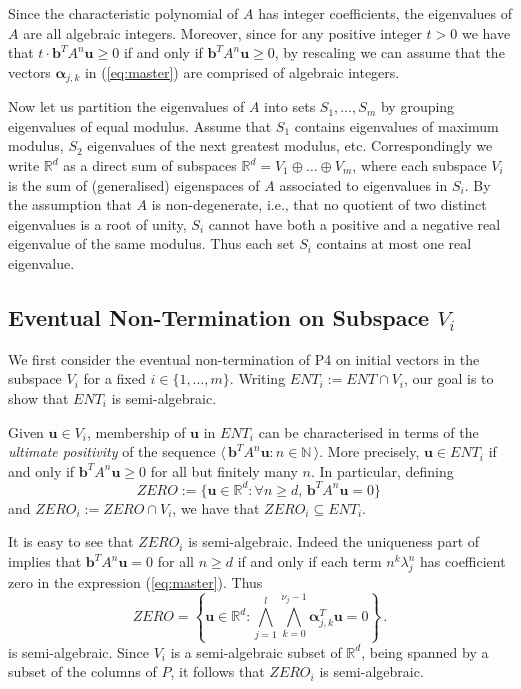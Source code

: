 Since the characteristic polynomial of $A$ has integer coefficients,
the eigenvalues of $A$ are all algebraic integers.  Moreover, since
for any positive integer $t>0$ we have that $t\cdot
\boldsymbol{b}^TA^n\boldsymbol{u} \geq 0$ if and only if
$\boldsymbol{b}^TA^n\boldsymbol{u}\geq 0$, by rescaling we can assume that
the vectors $\boldsymbol{\alpha}_{j,k}$ in (\ref{eq:master}) are
comprised of algebraic integers.

Now let us partition the eigenvalues of $A$ into sets $S_1,\ldots,S_m$
by grouping eigenvalues of equal modulus.  Assume that $S_1$ contains
eigenvalues of maximum modulus, $S_2$ eigenvalues of the next greatest
modulus, etc.  Correspondingly we write $\mathbb{R}^d$ as a
direct sum of subspaces $\mathbb{R}^d = V_1 \oplus \ldots \oplus V_m$,
where each subspace $V_i$ is the sum of (generalised) eigenspaces of
$A$ associated to eigenvalues in $S_i$.  By the assumption that $A$ is
non-degenerate, i.e., that no quotient of two distinct eigenvalues is
a root of unity, $S_i$ cannot have both a positive and a negative real
eigenvalue of the same modulus.  Thus each set $S_i$ contains at most one
real eigenvalue.

\subsection{Eventual Non-Termination on Subspace $V_i$}
We first consider the eventual non-termination of \textsf{P4} on
initial vectors in the subspace $V_i$ for a fixed $i \in
\{1,\ldots,m\}$.  Writing $\mathit{ENT}_i := \mathit{ENT} \cap V_i$,
our goal is to show that $\mathit{ENT}_i$ is semi-algebraic.

Given $\boldsymbol{u} \in V_i$, membership of $\boldsymbol{u}$ in
$\mathit{ENT}_i$ can be characterised in terms of the \emph{ultimate
  positivity} of the sequence $\langle\,
\boldsymbol{b}^TA^n\boldsymbol{u}:n\in\mathbb{N}\,\rangle$.  More
precisely, $\boldsymbol{u} \in \mathit{ENT}_i$ if and only if
$\boldsymbol{b}^TA^n\boldsymbol{u} \geq 0$ for all but finitely many
$n$.  In particular, defining
\[ \mathit{ZERO}:=\{\boldsymbol{u} \in \mathbb{R}^d: \forall
n\geq d,\, \boldsymbol{b}^TA^n\boldsymbol{u}=0 \} \, \] and
$\mathit{ZERO}_i:=\mathit{ZERO}\cap V_i$, we have that
$\mathit{ZERO}_i\subseteq \mathit{ENT}_i$.

It is easy to see that $\mathit{ZERO}_i$ is semi-algebraic.  Indeed
the uniqueness part of~\cite[Proposition 2.11]{TUCS05} implies that
$\boldsymbol{b}^TA^n\boldsymbol{u}=0$ for all $n\geq d$ if and only if
each term $n^k\lambda_j^n$ has coefficient zero in the expression
(\ref{eq:master}).  Thus
\[ \mathit{ZERO} = \left\{ \boldsymbol{u}\in \mathbb{R}^d :
\bigwedge_{j=1}^{l}\bigwedge_{k=0}^{\nu_j-1}
\boldsymbol{\alpha}_{j,k}^T\boldsymbol{u}= 0 \right\} \, .\] is
semi-algebraic.  Since $V_i$ is a semi-algebraic subset of
$\mathbb{R}^d$, being spanned by a subset of the columns of $P$, it
follows that $\mathit{ZERO}_i$ is semi-algebraic.

